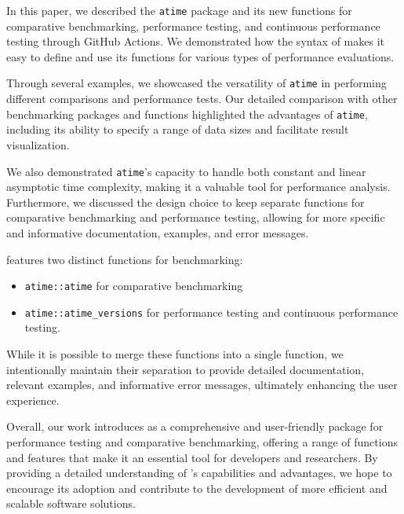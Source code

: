 In this paper, we described the \texttt{atime} package and its new functions for comparative benchmarking, performance testing, and continuous performance testing through GitHub Actions. We demonstrated how the syntax of  makes it easy to define and use its functions for various types of performance evaluations.

Through several examples, we showcased the versatility of \texttt{atime} in performing different comparisons and performance tests. Our detailed comparison with other benchmarking packages and functions highlighted the advantages of \texttt{atime}, including its ability to specify a range of data sizes and facilitate result visualization.


We also demonstrated \texttt{atime}'s capacity to handle both constant and linear asymptotic time complexity, making it a valuable tool for performance analysis. Furthermore, we discussed the design choice to keep separate functions for comparative benchmarking and performance testing, allowing for more specific and informative documentation, examples, and error messages.

 features two distinct functions for benchmarking: 
\begin{itemize}
 

    \item\texttt{atime::atime} for comparative benchmarking \item\texttt{atime::atime\_versions} for performance testing and continuous performance testing. 

\end{itemize}

While it is possible to merge these functions into a single function, we intentionally maintain their separation to provide detailed documentation, relevant examples, and informative error messages, ultimately enhancing the user experience.

Overall, our work introduces  as a comprehensive and user-friendly package for performance testing and comparative benchmarking, offering a range of functions and features that make it an essential tool for developers and researchers. By providing a detailed understanding of 's capabilities and advantages, we hope to encourage its adoption and contribute to the development of more efficient and scalable software solutions.








